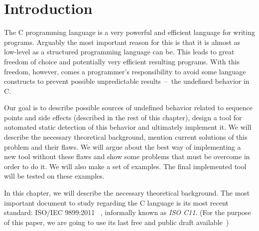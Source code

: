 
\chapter{Introduction}
The C programming language is a very powerful and efficient language for writing programs. Arguably the most important reason for this is that it is almost as low-level as a structured programming language can be. This leads to great freedom of choice and potentially very efficient resulting programs. With this freedom, however, comes a programmer's responsibility to avoid some language constructs to prevent possible unpredictable results~--~the undefined behavior in C.

Our goal is to describe possible sources of undefined behavior related to sequence points and side effects (described in the rest of this chapter), design a tool for automated static detection of this behavior and ultimately implement it. We will describe the necessary theoretical background, mention current solutions of this problem and their flaws. We will argue about the best way of implementing a new tool without these flaws and show some problems that must be overcome in order to do it. We will also make a set of examples. The final implemented tool will be tested on these examples.

In this chapter, we will describe the necessary theoretical background. The most important document to study regarding the C language is its most recent standard: ISO/IEC 9899:2011~\cite{C11} , informally known as \emph{ISO C11}. (For the purpose of this paper, we are going to use its last free and public draft available~\cite{WG14N1570})

